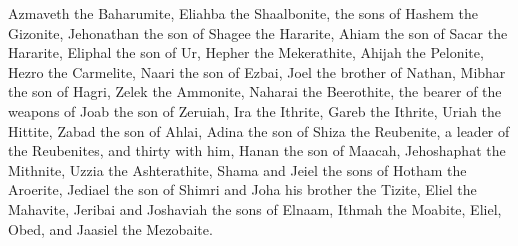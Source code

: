 \begin{biblechapter}
\verse Azmaveth the Baharumite, Eliahba the Shaalbonite,
\verse the sons of Hashem the Gizonite, Jehonathan the son of Shagee the Hararite,
\verse Ahiam the son of Sacar the Hararite, Eliphal the son of Ur,
\verse Hepher the Mekerathite, Ahijah the Pelonite,
\verse Hezro the Carmelite, Naari the son of Ezbai,
\verse Joel the brother of Nathan, Mibhar the son of Hagri,
\verse Zelek the Ammonite, Naharai the Beerothite, the bearer of the weapons of Joab the son of Zeruiah,
\verse Ira the Ithrite, Gareb the Ithrite,
\verse Uriah the Hittite, Zabad the son of Ahlai,
\verse Adina the son of Shiza the Reubenite, a leader of the Reubenites, and thirty with him,
\verse Hanan the son of Maacah, Jehoshaphat the Mithnite,
\verse Uzzia the Ashterathite, Shama and Jeiel the sons of Hotham the Aroerite,
\verse Jediael the son of Shimri and Joha his brother the Tizite,
\verse Eliel the Mahavite, Jeribai and Joshaviah the sons of Elnaam, Ithmah the Moabite,
\verse Eliel, Obed, and Jaasiel the Mezobaite.
\end{biblechapter}

